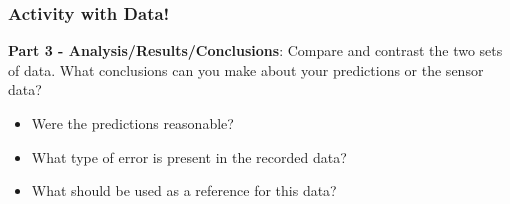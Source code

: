 \documentclass[fleqn]{beamer} %
\newcommand{\sectiontitleIV}{Activity with Data!}
\begin{document}
	\begin{frame}[label=sectionIV]
		\frametitle{\sectiontitleIV}
		\scriptsize
		{\bf Part 3 - Analysis/Results/Conclusions}: Compare and contrast the two sets of data. What conclusions can you make about your predictions or the sensor data?
		\begin{multicols}{2}

			\begin{itemize}
				\item Were the predictions reasonable? \\
				\item What type of error is present in the recorded data? \\
				\item What should be used as a reference for this data? \\ 
			\end{itemize}
			

\end{multicols}
\end{frame}
\end{document}
